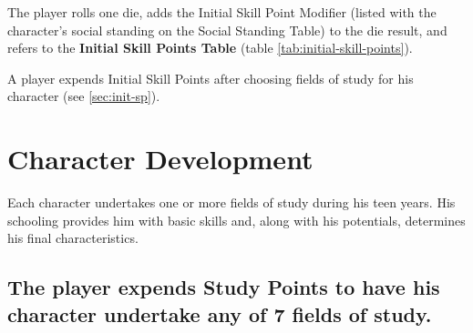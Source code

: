 The player rolls one die, adds the Initial Skill Point Modifier
(listed with the character's social standing on the Social Standing
Table) to the die result, and refers to the \textbf{Initial Skill
  Points Table}
(table \vref{tab:initial-skill-points}).

A player expends
Initial Skill Points after choosing fields of study for his character
(see \ref{sec:init-sp}).

           

\begin{table}[htbp]
  \centering
\end{table}


\section{Character Development}
\label{sec:char-devel}

Each character undertakes one or more fields of study during his teen
years. His schooling provides him with basic skills and, along with
his potentials, determines his final characteristics.


\subsection[Study Points and Fields of Study]{The player expends
  Study
  Points to have his character undertake any of 7 fields of study.}
\label{sec:fos}

